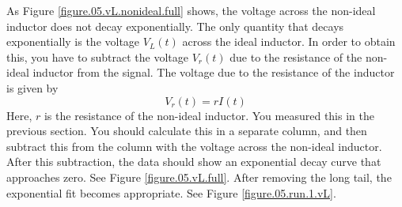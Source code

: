 As Figure \ref{figure.05.vL.nonideal.full} shows, the voltage across the non-ideal inductor does not decay exponentially. The only quantity that decays exponentially is the voltage $V_{L}(t)$ across the ideal inductor. In order to obtain this, you have to subtract the voltage $V_{r}(t)$ due to the resistance of the non-ideal inductor from the signal. The voltage due to the resistance of the inductor is given by
\begin{equation}
    V_{r}(t) = r I(t)
\end{equation}
Here, $r$ is the resistance of the non-ideal inductor. You measured this in the previous section. You should calculate this in a separate column, and then subtract this from the column with the voltage across the non-ideal inductor. After this subtraction, the data should show an exponential decay curve that approaches zero. See Figure \ref{figure.05.vL.full}. After removing the long tail, the exponential fit becomes appropriate. See Figure \ref{figure.05.run.1.vL}.
